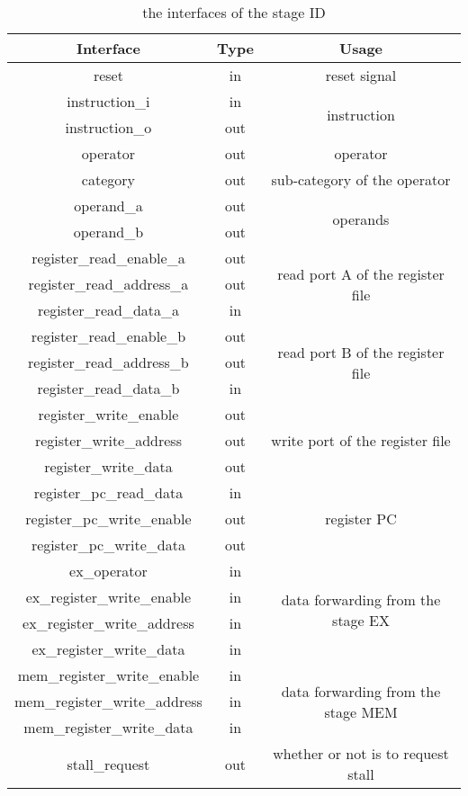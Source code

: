 \begin{table}[!h]
\centering
\begin{tabular}{|c|c|c|}
\hline
Interface & Type & Usage \\ \hline
reset & in & reset signal \\ \hline
instruction\_i & in & \multirow{2}{*}{instruction} \\ \cline{1-2}
instruction\_o & out &  \\ \hline
operator & out & operator \\ \hline
category & out & sub-category of the operator \\ \hline
operand\_a & out & \multirow{2}{*}{operands} \\ \cline{1-2}
operand\_b & out &  \\ \hline
register\_read\_enable\_a & out & \multirow{3}{*}{read port A of the register file} \\ \cline{1-2}
register\_read\_address\_a & out &  \\ \cline{1-2}
register\_read\_data\_a & in &  \\ \hline
register\_read\_enable\_b & out & \multirow{3}{*}{read port B of the register file} \\ \cline{1-2}
register\_read\_address\_b & out &  \\ \cline{1-2}
register\_read\_data\_b & in &  \\ \hline
register\_write\_enable & out & \multirow{3}{*}{write port of the register file} \\ \cline{1-2}
register\_write\_address & out &  \\ \cline{1-2}
register\_write\_data & out &  \\ \hline
register\_pc\_read\_data & in & \multirow{3}{*}{register PC} \\ \cline{1-2}
register\_pc\_write\_enable & out &  \\ \cline{1-2}
register\_pc\_write\_data & out &  \\ \hline
ex\_operator & in & \multirow{4}{*}{data forwarding from the stage EX} \\ \cline{1-2}
ex\_register\_write\_enable & in &  \\ \cline{1-2}
ex\_register\_write\_address & in &  \\ \cline{1-2}
ex\_register\_write\_data & in &  \\ \hline
mem\_register\_write\_enable & in & \multirow{3}{*}{data forwarding from the stage MEM} \\ \cline{1-2}
mem\_register\_write\_address & in &  \\ \cline{1-2}
mem\_register\_write\_data & in &  \\ \hline
stall\_request & out & whether or not is to request stall \\ \hline
\end{tabular}
\caption{the interfaces of the stage ID}
\end{table}
